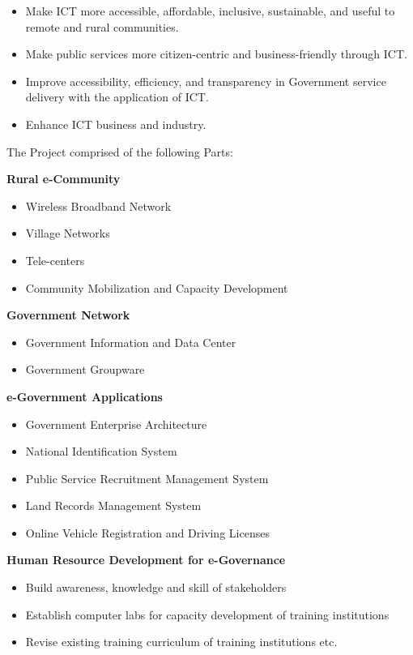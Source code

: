 \begin{itemize}
	\item Make ICT more accessible, affordable, inclusive, sustainable, and useful to remote and rural communities.  
	\item Make public services more citizen-centric and business-friendly through ICT.  
	\item Improve accessibility, efficiency, and transparency in Government service delivery with the application of ICT.  
	\item Enhance ICT business and industry.
\end{itemize}

The Project comprised of the following Parts: 

\begin{steps}[label=\textit{PART} \arabic* :]
	\item \textbf{Rural e-Community }
	\begin{itemize}
		\item Wireless Broadband Network
		\item Village Networks
		\item Tele-centers
		\item Community Mobilization and Capacity Development 
	\end{itemize}
	\item \textbf{Government Network}
	\begin{itemize}
		\item Government Information and Data Center
		\item Government Groupware 
	\end{itemize}
\item \textbf{e-Government Applications }
\begin{itemize}
	\item Government Enterprise Architecture
	\item National Identification System
	\item Public Service Recruitment Management System
	\item Land Records Management System
	\item Online Vehicle Registration and Driving Licenses 
\end{itemize}
\item \textbf{Human Resource Development for e-Governance}
\begin{itemize}
	\item Build awareness, knowledge and skill of stakeholders
	\item Establish computer labs for capacity development of 
	training institutions
	\item Revise existing training curriculum of training institutions  etc.
\end{itemize}
\end{steps}

